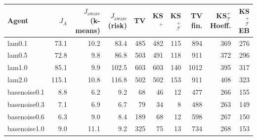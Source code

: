 \begin{tabular}{lrrrrrrrrr}
\toprule
 Agent & $J_A$ & $J_{\mathrm{aware}}$ (k-means) & $J_{\mathrm{aware}}$ (risk) & TV & KS$^+$ & KS$^+_{\mathcal T}$ & TV fin. & KS$^+_{\mathcal T}$ Hoeff. & KS$^+_{\mathcal T}$ EB \\
\midrule
lam0.1 & 73.1 & 10.2 & 83.4 & 485 & 482 & 115 & 894 & 369 & 276 \\
lam0.5 & 72.8 & 9.8 & 86.8 & 503 & 491 & 118 & 911 & 372 & 296 \\
lam1.0 & 85.1 & 9.9 & 102.5 & 603 & 603 & 140 & 1012 & 395 & 317 \\
lam2.0 & 115.1 & 10.8 & 116.8 & 502 & 502 & 153 & 911 & 408 & 323 \\
basenoise0.1 & 8.8 & 6.2 & 9.2 & 68 & 46 & 12 & 477 & 266 & 155 \\
basenoise0.3 & 7.1 & 6.9 & 6.7 & 79 & 34 & 8 & 488 & 263 & 149 \\
basenoise0.6 & 6.3 & 9.0 & 8.4 & 189 & 68 & 12 & 598 & 267 & 150 \\
basenoise1.0 & 9.0 & 11.1 & 9.2 & 325 & 75 & 13 & 734 & 268 & 153 \\
\bottomrule
\end{tabular}